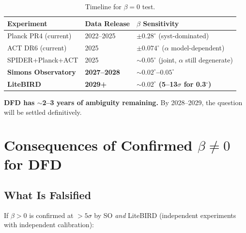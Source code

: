 \documentclass[11pt]{article}
\begin{document}
\begin{table}[h]
\centering
\caption{Timeline for $\beta = 0$ test.}
\label{tab:timeline}
\begin{tabular}{lll}
\toprule
\textbf{Experiment} & \textbf{Data Release} & \textbf{$\beta$ Sensitivity} \\
\midrule
Planck PR4 (current) & 2022--2025 & $\pm 0.28^\circ$ (syst-dominated) \\
ACT DR6 (current) & 2025 & $\pm 0.074^\circ$ ($\alpha$ model-dependent) \\
SPIDER+Planck+ACT & 2025 & $\sim 0.05^\circ$ (joint, $\alpha$ still degenerate) \\
\textbf{Simons Observatory} & \textbf{2027--2028} & \textbf{$\sim 0.02^\circ$--$0.05^\circ$} \\
\textbf{LiteBIRD} & \textbf{2029+} & \textbf{$\sim 0.02^\circ$ (5--13$\sigma$ for 0.3$^\circ$)} \\
\bottomrule
\end{tabular}
\end{table}

\textbf{DFD has $\sim$2--3 years of ambiguity remaining.}  By 2028--2029,
the question will be settled definitively.


\section{Consequences of Confirmed $\beta \neq 0$ for DFD}
\label{sec:consequences}

\subsection{What Is Falsified}

If $\beta > 0$ is confirmed at $>5\sigma$ by SO \emph{and} LiteBIRD
(independent experiments with independent calibration):
\end{document}
